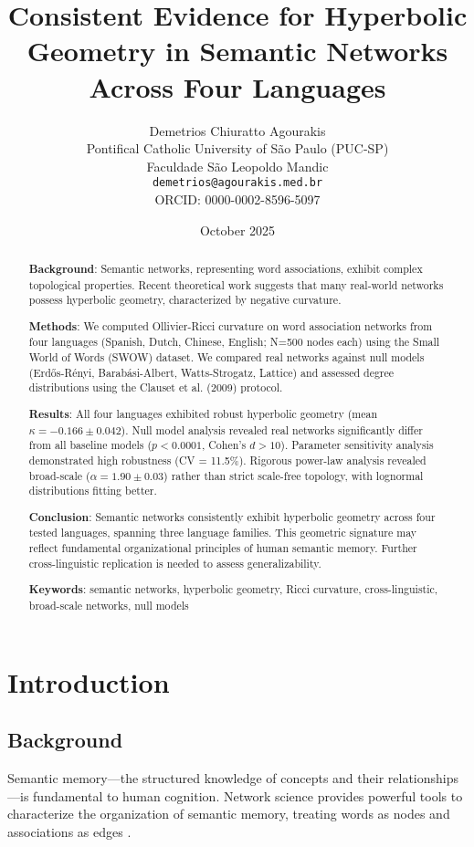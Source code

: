 \documentclass[12pt]{article}
\title{Consistent Evidence for Hyperbolic Geometry in Semantic Networks Across Four Languages}
\author{Demetrios Chiuratto Agourakis\\
  \small Pontifical Catholic University of São Paulo (PUC-SP)\\
  \small Faculdade São Leopoldo Mandic\\
  \small \texttt{demetrios@agourakis.med.br}\\
  \small ORCID: 0000-0002-8596-5097
}
\date{October 2025}
\begin{document}
\maketitle

\begin{abstract}
\textbf{Background}: Semantic networks, representing word associations, exhibit complex topological properties. Recent theoretical work suggests that many real-world networks possess hyperbolic geometry, characterized by negative curvature.

\textbf{Methods}: We computed Ollivier-Ricci curvature on word association networks from four languages (Spanish, Dutch, Chinese, English; N=500 nodes each) using the Small World of Words (SWOW) dataset. We compared real networks against null models (Erdős-Rényi, Barabási-Albert, Watts-Strogatz, Lattice) and assessed degree distributions using the Clauset et al. (2009) protocol.

\textbf{Results}: All four languages exhibited robust hyperbolic geometry (mean $\kappa = -0.166 \pm 0.042$). Null model analysis revealed real networks significantly differ from all baseline models ($p < 0.0001$, Cohen's $d > 10$). Parameter sensitivity analysis demonstrated high robustness (CV = 11.5\%). Rigorous power-law analysis revealed broad-scale ($\alpha = 1.90 \pm 0.03$) rather than strict scale-free topology, with lognormal distributions fitting better.

\textbf{Conclusion}: Semantic networks consistently exhibit hyperbolic geometry across four tested languages, spanning three language families. This geometric signature may reflect fundamental organizational principles of human semantic memory. Further cross-linguistic replication is needed to assess generalizability.

\noindent\textbf{Keywords}: semantic networks, hyperbolic geometry, Ricci curvature, cross-linguistic, broad-scale networks, null models
\end{abstract}

\section{Introduction}

\subsection{Background}

Semantic memory—the structured knowledge of concepts and their relationships—is fundamental to human cognition. Network science provides powerful tools to characterize the organization of semantic memory, treating words as nodes and associations as edges \citep{steyvers2005, dedeyne2019, siew2019}.
\end{document}
